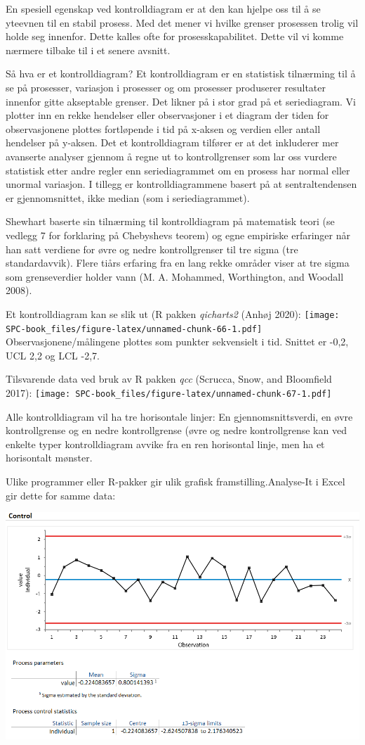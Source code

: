 \documentclass[
]{book}
\begin{document}
En spesiell egenskap ved kontrolldiagram er at den kan hjelpe oss til å se yteevnen til en stabil prosess. Med det mener vi hvilke grenser prosessen trolig vil holde seg innenfor. Dette kalles ofte for prosesskapabilitet. Dette vil vi komme nærmere tilbake til i et senere avsnitt.

Så hva er et kontrolldiagram? Et kontrolldiagram er en statistisk tilnærming til å se på prosesser, variasjon i prosesser og om prosesser produserer resultater innenfor gitte akseptable grenser. Det likner på i stor grad på et seriediagram. Vi plotter inn en rekke hendelser eller observasjoner i et diagram der tiden for observasjonene plottes fortløpende i tid på x-aksen og verdien eller antall hendelser på y-aksen. Det et kontrolldiagram tilfører er at det inkluderer mer avanserte analyser gjennom å regne ut to kontrollgrenser som lar oss vurdere statistisk etter andre regler enn seriediagrammet om en prosess har normal eller unormal variasjon. I tillegg er kontrolldiagrammene basert på at sentraltendensen er gjennomsnittet, ikke median (som i seriediagrammet).

Shewhart baserte sin tilnærming til kontrolldiagram på matematisk teori (se vedlegg 7 for forklaring på Chebyshevs teorem) og egne empiriske erfaringer når han satt verdiene for øvre og nedre kontrollgrenser til tre sigma (tre standardavvik). Flere tiårs erfaring fra en lang rekke områder viser at tre sigma som grenseverdier holder vann (M. A. Mohammed, Worthington, and Woodall 2008).

Et kontrolldiagram kan se slik ut (R pakken \emph{qicharts2} (Anhøj 2020):
\texttt{[image: SPC-book\_files/figure-latex/unnamed-chunk-66-1.pdf]}
Observasjonene/målingene plottes som punkter sekvensielt i tid. Snittet er -0,2, UCL 2,2 og LCL -2,7.

Tilsvarende data ved bruk av R pakken \emph{qcc} (Scrucca, Snow, and Bloomfield 2017):
\texttt{[image: SPC-book\_files/figure-latex/unnamed-chunk-67-1.pdf]}

Alle kontrolldiagram vil ha tre horisontale linjer: En gjennomsnittsverdi, en øvre kontrollgrense og en nedre kontrollgrense (øvre og nedre kontrollgrense kan ved enkelte typer kontrolldiagram avvike fra en ren horisontal linje, men ha et horisontalt mønster.

Ulike programmer eller R-pakker gir ulik grafisk framstilling.Analyse-It i Excel gir dette for samme data:

\includegraphics{Eks_kontrdiagr.png}
\end{document}
